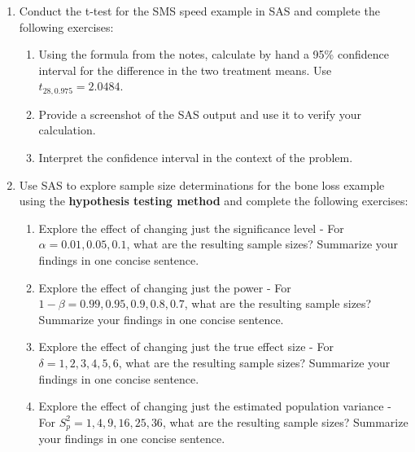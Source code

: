 \documentclass[11pt]{article}
\begin{document}
\vspace{12pt}
\begin{enumerate}
\item Conduct the t-test for the SMS speed example in SAS and complete the following exercises:
	\begin{enumerate}
	\item Using the formula from the notes, calculate by hand a 95\% confidence interval for the difference in the two treatment means. Use $t_{28,0.975}=2.0484$.
	\item Provide a screenshot of the SAS output and use it to verify your calculation.
	\item Interpret the confidence interval in the context of the problem. 
	\end{enumerate}
	
\vspace{12pt}
\item Use SAS to explore sample size determinations for the bone loss example using the \textbf{hypothesis testing method} and complete the following exercises:
	\begin{enumerate}
	\item Explore the effect of changing just the significance level - For $\alpha = 0.01, 0.05, 0.1$, what are the resulting sample sizes? Summarize your findings in one concise sentence.
	\item Explore the effect of changing just the power - For $1-\beta = 0.99, 0.95, 0.9, 0.8, 0.7$, what are the resulting sample sizes? Summarize your findings in one concise sentence.
	\item Explore the effect of changing just the true effect size - For $\delta = 1, 2, 3, 4, 5, 6$, what are the resulting sample sizes? Summarize your findings in one concise sentence.
	\item Explore the effect of changing just the estimated population variance - For $S_p^2 = 1, 4, 9, 16, 25, 36$, what are the resulting sample sizes? Summarize your findings in one concise sentence.
	\end{enumerate}
	

\end{enumerate}
\end{document}
